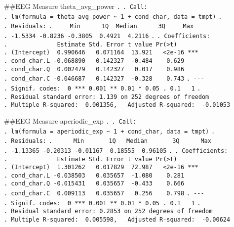 \documentclass[
]{article}
\begin{document}
\#\#EEG Measure theta\_avg\_power \texttt{.} \texttt{.\ Call:}
\texttt{.\ lm(formula\ =\ theta\_avg\_power\ \textasciitilde{}\ 1\ +\ cond\_char,\ data\ =\ tmpt)}
\texttt{.} \texttt{.\ Residuals:}
\texttt{.\ \ \ \ \ Min\ \ \ \ \ \ 1Q\ \ Median\ \ \ \ \ \ 3Q\ \ \ \ \ Max}
\texttt{.\ -1.5334\ -0.8236\ -0.3805\ \ 0.4921\ \ 4.2116} \texttt{.}
\texttt{.\ Coefficients:}
\texttt{.\ \ \ \ \ \ \ \ \ \ \ \ \ \ Estimate\ Std.\ Error\ t\ value\ Pr(\textgreater{}\textbar{}t\textbar{})}
\texttt{.\ (Intercept)\ \ 0.990646\ \ \ 0.071164\ \ 13.921\ \ \ \textless{}2e-16\ ***}
\texttt{.\ cond\_char.L\ -0.068890\ \ \ 0.142327\ \ -0.484\ \ \ \ 0.629}
\texttt{.\ cond\_char.Q\ \ 0.002479\ \ \ 0.142327\ \ \ 0.017\ \ \ \ 0.986}
\texttt{.\ cond\_char.C\ -0.046687\ \ \ 0.142327\ \ -0.328\ \ \ \ 0.743}
\texttt{.\ -\/-\/-}
\texttt{.\ Signif.\ codes:\ \ 0\ \textquotesingle{}***\textquotesingle{}\ 0.001\ \textquotesingle{}**\textquotesingle{}\ 0.01\ \textquotesingle{}*\textquotesingle{}\ 0.05\ \textquotesingle{}.\textquotesingle{}\ 0.1\ \textquotesingle{}\ \textquotesingle{}\ 1}
\texttt{.}
\texttt{.\ Residual\ standard\ error:\ 1.139\ on\ 252\ degrees\ of\ freedom}
\texttt{.\ Multiple\ R-squared:\ \ 0.001356,\ \ \ Adjusted\ R-squared:\ \ -0.01053}

\#\#EEG Measure aperiodic\_exp \texttt{.} \texttt{.\ Call:}
\texttt{.\ lm(formula\ =\ aperiodic\_exp\ \textasciitilde{}\ 1\ +\ cond\_char,\ data\ =\ tmpt)}
\texttt{.} \texttt{.\ Residuals:}
\texttt{.\ \ \ \ \ \ Min\ \ \ \ \ \ \ 1Q\ \ \ Median\ \ \ \ \ \ \ 3Q\ \ \ \ \ \ Max}
\texttt{.\ -1.13365\ -0.20313\ -0.01167\ \ 0.18555\ \ 0.96105}
\texttt{.} \texttt{.\ Coefficients:}
\texttt{.\ \ \ \ \ \ \ \ \ \ \ \ \ \ Estimate\ Std.\ Error\ t\ value\ Pr(\textgreater{}\textbar{}t\textbar{})}
\texttt{.\ (Intercept)\ \ 1.301262\ \ \ 0.017829\ \ 72.987\ \ \ \textless{}2e-16\ ***}
\texttt{.\ cond\_char.L\ -0.038503\ \ \ 0.035657\ \ -1.080\ \ \ \ 0.281}
\texttt{.\ cond\_char.Q\ -0.015431\ \ \ 0.035657\ \ -0.433\ \ \ \ 0.666}
\texttt{.\ cond\_char.C\ \ 0.009113\ \ \ 0.035657\ \ \ 0.256\ \ \ \ 0.798}
\texttt{.\ -\/-\/-}
\texttt{.\ Signif.\ codes:\ \ 0\ \textquotesingle{}***\textquotesingle{}\ 0.001\ \textquotesingle{}**\textquotesingle{}\ 0.01\ \textquotesingle{}*\textquotesingle{}\ 0.05\ \textquotesingle{}.\textquotesingle{}\ 0.1\ \textquotesingle{}\ \textquotesingle{}\ 1}
\texttt{.}
\texttt{.\ Residual\ standard\ error:\ 0.2853\ on\ 252\ degrees\ of\ freedom}
\texttt{.\ Multiple\ R-squared:\ \ 0.005598,\ \ \ Adjusted\ R-squared:\ \ -0.00624}
\end{document}
